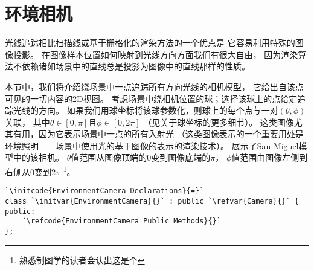 \section{环境相机}\label{sec:环境相机}
光线追踪相比扫描线或基于栅格化的渲染方法的一个优点是
它容易利用特殊的图像投影。
在图像样本位置如何映射到光线方向方面我们有很大自由，
因为渲染算法不依赖诸如场景中的直线总是投影为图像中的直线那样的性质。

本节中，我们将介绍绕场景中一点追踪所有方向光线的相机模型，
它给出自该点可见的一切内容的2D视图。
考虑场景中绕相机位置的球；选择该球上的点给定追踪光线的方向。
如果我们用球坐标将该球参数化，则球上的每个点与一对$(\theta,\phi)$关联，
其中$\theta\in[0,\pi]$且$\phi\in[0,2\pi]$
（见关于球坐标的更多细节）。
这类图像尤其有用，因为它表示场景中一点的所有入射光
（这类图像表示的一个重要用处是环境照明——场景中使用光的基于图像的表示的渲染技术）。
展示了San Miguel模型中的该相机。
$\theta$值范围从图像顶端的0变到图像底端的$\pi$，
$\phi$值范围由图像左侧到右侧从0变到$2\pi$
\footnote{熟悉制图学的读者会认出这是个}。
\begin{lstlisting}
`\initcode{EnvironmentCamera Declarations}{=}`
class `\initvar{EnvironmentCamera}{}` : public `\refvar{Camera}{}` {
public:
    `\refcode{EnvironmentCamera Public Methods}{}`
};
\end{lstlisting}

